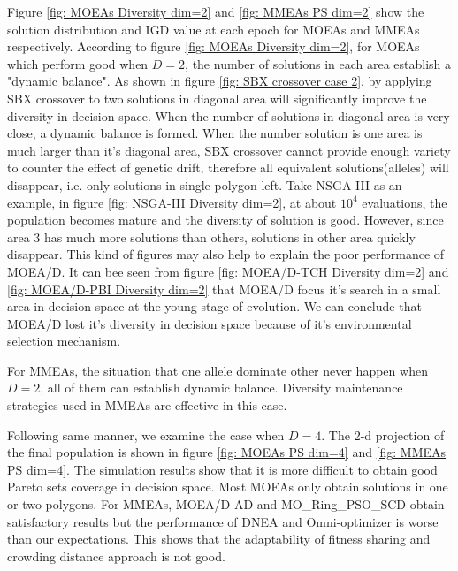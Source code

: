 \documentclass[conference]{IEEEtran}
\begin{document}
Figure \ref{fig: MOEAs Diversity dim=2} and \ref{fig: MMEAs PS dim=2} show the solution distribution and IGD value at each epoch for MOEAs and MMEAs respectively. According to figure \ref{fig: MOEAs Diversity dim=2}, for MOEAs which perform good when $D=2$, the number of solutions in each area establish a "dynamic balance". As shown in figure \ref{fig: SBX crossover case 2}, by applying SBX crossover to two solutions in diagonal area will significantly improve the diversity in decision space. When the number of solutions in diagonal area is very close, a dynamic balance is formed. When the number solution is one area is much larger than it's diagonal area, SBX crossover cannot provide enough variety to counter the effect of genetic drift, therefore all equivalent solutions(alleles) will disappear, i.e. only solutions in single polygon left. Take NSGA-III as an example, in figure \ref{fig: NSGA-III Diversity dim=2}, at about $10^4$ evaluations, the population becomes mature and the diversity of solution is good. However, since area 3 has much more solutions than others, solutions in other area quickly disappear. This kind of figures may also help to explain the poor performance of MOEA/D. It can bee seen from figure \ref{fig: MOEA/D-TCH Diversity dim=2} and \ref{fig: MOEA/D-PBI Diversity dim=2} that MOEA/D focus it's search in a small area in decision space at the young stage of evolution. We can conclude that MOEA/D lost it's diversity in decision space because of it's environmental selection mechanism.

For MMEAs, the situation that one allele dominate other never happen when $D=2$, all of them can establish dynamic balance. Diversity maintenance strategies used in MMEAs are effective in this case.

Following same manner, we examine the case when $D=4$. The 2-d projection of the final population is shown in figure \ref{fig: MOEAs PS dim=4} and \ref{fig: MMEAs PS dim=4}. The simulation results show that it is more difficult to obtain good Pareto sets coverage in decision space. Most MOEAs only obtain solutions in one or two polygons. For MMEAs, MOEA/D-AD and MO\_Ring\_PSO\_SCD obtain satisfactory results but the performance of DNEA and Omni-optimizer is worse than our expectations. This shows that the adaptability of fitness sharing and crowding distance approach is not good.
\end{document}
